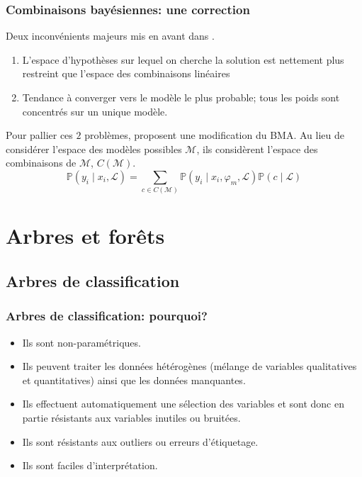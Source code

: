 \documentclass[dvipsnames,10pt]{beamer}
\theoremstyle{plain}
\theoremstyle{definition}
\begin{document}
\begin{frame}
\frametitle{Combinaisons bayésiennes: une correction}
Deux inconvénients majeurs mis en avant dans \citet{Minka2002}.
\begin{enumerate}
    \item L'espace d'hypothèses sur lequel on cherche la solution est nettement plus restreint que l'espace des combinaisons linéaires
    \item Tendance à converger vers le modèle le plus probable; tous les poids sont concentrés sur un unique modèle.
\end{enumerate}
Pour pallier ces $2$ problèmes, \citet{Monteith2011b} proposent une modification du BMA. Au lieu de considérer l'espace des modèles possibles $\mathcal{M}$, ils considèrent l'espace des combinaisons de $\mathcal{M}$, $C ( \mathcal{M} )$.\begin{equation}
    \mathbb{P} ( y_i \mid x_i , \mathcal{L} ) = \sum_{c \in C ( \mathcal{M} )} \mathbb{P} (y_i \mid x_i,  \varphi_m , \mathcal{L}) \mathbb{P} ( c \mid \mathcal{L} )
    \label{equ:bmc}
\end{equation}
\end{frame}

\section{Arbres et forêts}
\subsection{Arbres de classification}

\begin{frame}
\frametitle{Arbres de classification: pourquoi?}
\begin{itemize}
    \item Ils sont non-paramétriques.
    \item Ils peuvent traiter les données hétérogènes (mélange de variables qualitatives et quantitatives) ainsi que les données manquantes.
    \item Ils effectuent automatiquement une sélection des variables et sont donc en partie résistants aux variables inutiles ou bruitées.
    \item Ils sont résistants aux outliers ou erreurs d'étiquetage.
    \item Ils sont faciles d'interprétation.
\end{itemize}
\end{frame}
\end{document}
